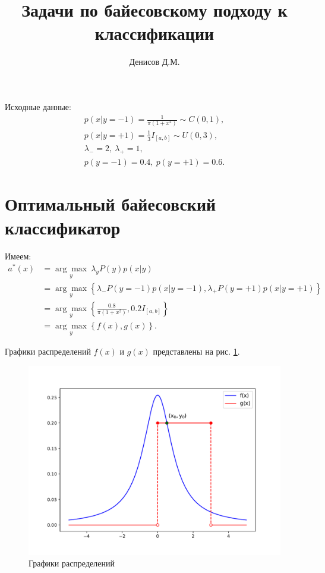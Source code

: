 \documentclass[14pt,a4paper]{article}
\title{Задачи по байесовскому подходу к классификации}
\author{Денисов Д.М.}
\date{}
\begin{document}
    \maketitle

    Исходные данные:
    \[
        \begin{gathered}
            p(x | y = -1) = \frac{1}{\pi (1 + x^2)} \sim C(0, 1), \\
            p(x | y = +1) = \frac{1}{3} I_{[a, b]} \sim U(0, 3), \\
            \lambda_{-} = 2, \ \lambda_{+} = 1, \\
            p(y = -1) =  0.4, \ p(y = +1) = 0.6.
        \end{gathered}
    \]

    \section{Оптимальный байесовский классификатор}

    Имеем:
    \[
        \begin{aligned}
            a^*(x) &= \underset{y}{\arg\!\max} \ \lambda_y P(y) p(x | y) \\
            &= \underset{y}{\arg\!\max} \left\{ \lambda_{-} P(y = -1) p(x | y = -1), \lambda_{+} P(y = +1) p(x | y = +1) \right\} \\
            &= \underset{y}{\arg\!\max} \left\{ \frac{0.8}{\pi (1 + x^2)}, 0.2 I_{[a, b]} \right\} \\
            &= \underset{y}{\arg\!\max} \left\{ f(x), g(x) \right\}.
        \end{aligned}
    \]

    Графики распределений $f(x)$ и $g(x)$ представлены на рис. \ref{fig:distribs}.
    \begin{figure}[h]
        \centering
        \includegraphics[width=\textwidth]{distribs.pdf}
        \caption{Графики распределений}
        \label{fig:distribs}
    \end{figure}
\end{document}
